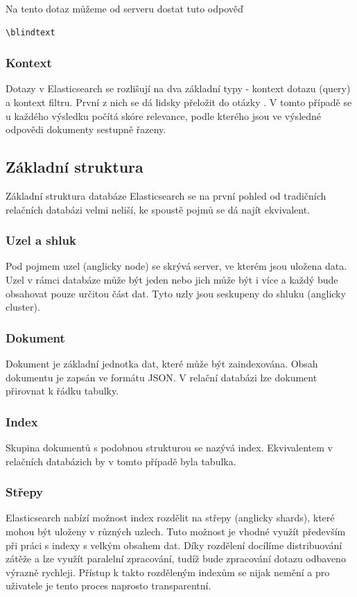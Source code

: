 Na tento dotaz můžeme od serveru dostat tuto odpověď
\begin{verbatim}
\blindtext
\end{verbatim} 

\subsubsection*{Kontext}
Dotazy v Elasticsearch se rozlišují na dva základní typy - kontext dotazu (query) a kontext filtru.
První z nich se dá lidsky přeložit do otázky . V tomto případě se u každého výsledku počítá skóre relevance, podle kterého jsou ve výsledné odpovědi dokumenty sestupně řazeny.


\subsection{Základní struktura}
Základní struktura databáze Elasticsearch se na první pohled od tradičních relačních databázi velmi neliší, ke spoustě pojmů se dá najít ekvivalent.

\subsubsection*{Uzel a shluk}
Pod pojmem uzel (anglicky node) se skrývá server, ve kterém jsou uložena data. Uzel v rámci databáze může být jeden nebo jich může být i více a každý bude obsahovat pouze určitou část dat. Tyto uzly jsou seskupeny do shluku (anglicky cluster).


\subsubsection*{Dokument}
Dokument je základní jednotka dat, které může být zaindexována. Obsah dokumentu je zapsán ve formátu JSON. V relační databázi lze dokument přirovnat k řádku tabulky.

\subsubsection*{Index}
Skupina dokumentů s podobnou strukturou se nazývá index. Ekvivalentem v relačních databázich by v tomto případě byla tabulka.

\subsubsection*{Střepy}
Elasticsearch nabízí možnost index rozdělit na střepy (anglicky shards), které mohou být uloženy v různých uzlech. Tuto možnost je vhodné využít především při práci s indexy s velkým obsahem dat. Díky rozdělení docílíme distribuování zátěže a lze využít paralelní zpracování, tudíž bude zpracování dotazu odbaveno výrazně rychleji. 
Přístup k takto rozděleným indexům se nijak nemění a pro uživatele je tento proces naprosto transparentní.

